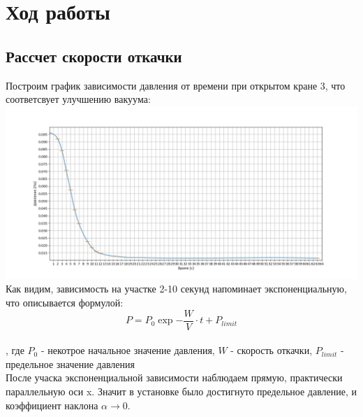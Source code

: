 \documentclass[a4paper, 12pt]{article}%
\begin{document}
\section{Ход работы}
\subsection{Рассчет скорости откачки}
Построим график зависимости давления от времени при открытом кране 3, что соответсвует улучшению вакуума: \\
\includegraphics[scale = 0.3]{fig2.jpg} \\
Как видим, зависимость на участке 2-10 секунд напоминает экспоненциальную, что описывается формулой: 
\begin{equation}\label{PbyTime}
P = P_{0}\exp{-\frac{W}{V}\cdot t}+P_{limit}
\end{equation}
\\
, где $P_{0}$ - некотрое начальное значение давления, $W$ - скорость откачки, $P_{limit}$ - предельное значение давления
\\
После учаска экспоненциальной зависимости наблюдаем прямую, практически параллельную оси x. Значит в установке было достигнуто предельное давление, и коэффициент наклона $\alpha \xrightarrow[]{} 0$.
\end{document}
